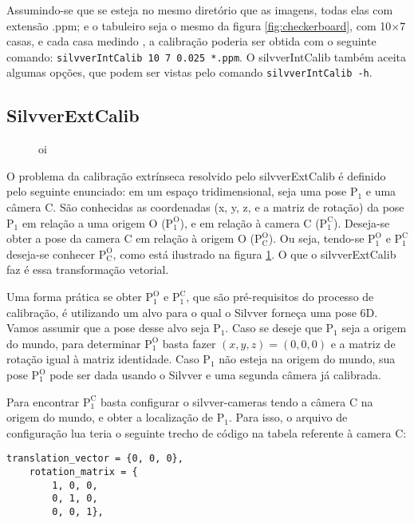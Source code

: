 \documentclass[a4paper,10pt]{article}
\begin{document}
Assumindo-se que se esteja no mesmo diretório que as imagens, todas elas com
extensão .ppm; e o tabuleiro seja o mesmo da figura \ref{fig:checkerboard},
com 10$\times$7 casas, e cada casa medindo , a calibração
poderia ser obtida com o seguinte comando: \texttt{silvverIntCalib 10 7 0.025
  *.ppm}. O silvverIntCalib também aceita algumas opções, que podem ser vistas
pelo comando \texttt{silvverIntCalib -h}.

\subsection{SilvverExtCalib}

\begin{figure}[h]
  \centering
  \caption{oi}
  \label{fig:silvverExtCalib}
\end{figure}

O problema da calibração extrínseca resolvido pelo silvverExtCalib é definido
pelo seguinte enunciado: em um espaço tridimensional, seja uma pose
$\mathrm{P_1}$ e uma câmera C. São conhecidas as coordenadas (x, y, z, e a
matriz de rotação) da pose $\mathrm{P_1}$ em relação a uma origem O
($\mathrm{P_1^O}$), e em relação à camera C ($\mathrm{P_1^C}$). Deseja-se
obter a pose da camera C em relação à origem O ($\mathrm{P_C^O}$). Ou seja,
tendo-se $\mathrm{P_1^O}$ e $\mathrm{P_1^C}$ deseja-se conhecer
$\mathrm{P_C^O}$, como está ilustrado na figura \ref{fig:silvverExtCalib}. O
que o silvverExtCalib faz é essa transformação vetorial.


Uma forma prática se obter $\mathrm{P_1^O}$ e $\mathrm{P_1^C}$, que são
pré-requisitos do processo de calibração, é utilizando um alvo para o qual o
Silvver forneça uma pose 6D. Vamos assumir que a pose desse alvo seja
$\mathrm{P_1}$. Caso se deseje que $\mathrm{P_1}$ seja a origem do mundo, para
determinar $\mathrm{P_1^O}$ basta fazer $(x,y,z) = (0,0,0)$ e a matriz de
rotação igual à matriz identidade. Caso $\mathrm{P_1}$ não esteja na origem do
mundo, sua pose $\mathrm{P_1^O}$ pode ser dada usando o Silvver e uma segunda
câmera já calibrada.

Para encontrar $\mathrm{P_1^C}$ basta configurar o silvver-cameras tendo a
câmera C na origem do mundo, e obter a localização de $\mathrm{P_1}$. Para
isso, o arquivo de configuração lua teria o seguinte trecho de código na
tabela referente à camera C:
\begin{lstlisting}[numbers=none]
    translation_vector = {0, 0, 0},
    rotation_matrix = {
        1, 0, 0,
        0, 1, 0,
        0, 0, 1},
\end{lstlisting}
\end{document}
